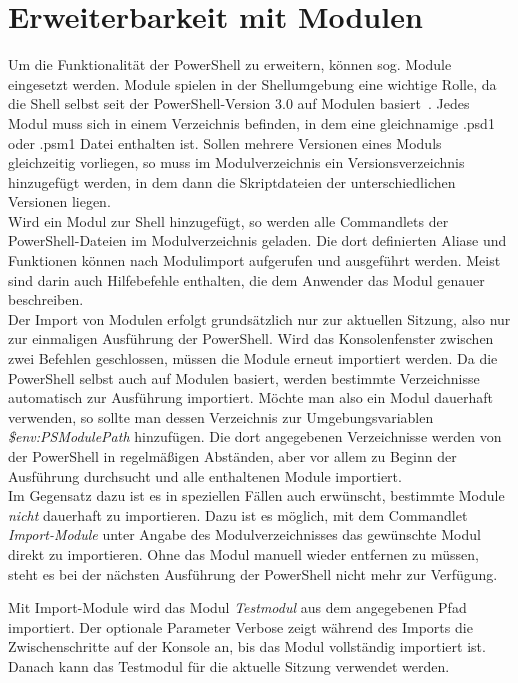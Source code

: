 \cite[S.~53 f.]{Monadjemi2017}
\section{Erweiterbarkeit mit Modulen}\label{PSModules}
Um die Funktionalität der PowerShell zu erweitern, können sog. Module eingesetzt werden. Module spielen in der Shellumgebung eine wichtige Rolle, da die Shell selbst seit der PowerShell-Version 3.0 auf Modulen basiert~\cite[S.~73]{Monadjemi2017}. Jedes Modul muss sich in einem Verzeichnis befinden, in dem eine gleichnamige .psd1 oder .psm1 Datei enthalten ist. Sollen mehrere Versionen eines Moduls gleichzeitig vorliegen, so muss im Modulverzeichnis ein Versionsverzeichnis hinzugefügt werden, in dem dann die Skriptdateien der unterschiedlichen Versionen liegen. \cite[S.~8 f.]{Monadjemi2017}\medskip\\
Wird ein Modul zur Shell hinzugefügt, so werden alle Commandlets der PowerShell-Dateien im Modulverzeichnis geladen. Die dort definierten Aliase und Funktionen können nach Modulimport aufgerufen und ausgeführt werden. Meist sind darin auch Hilfebefehle enthalten, die dem Anwender das Modul genauer beschreiben.\medskip\\
Der Import von Modulen erfolgt grundsätzlich nur zur aktuellen Sitzung, also nur zur einmaligen Ausführung der PowerShell. Wird das Konsolenfenster zwischen zwei Befehlen geschlossen, müssen die Module erneut importiert werden. Da die \mbox{PowerShell} selbst auch auf Modulen basiert, werden bestimmte Verzeichnisse automatisch zur Ausführung importiert. Möchte man also ein Modul dauerhaft verwenden, so sollte man dessen Verzeichnis zur Umgebungsvariablen \textit{\$env:PSModulePath} hinzufügen. Die dort angegebenen Verzeichnisse werden von der PowerShell in regelmäßigen Abständen, aber vor allem zu Beginn der Ausführung durchsucht und alle enthaltenen Module importiert.~\cite[S.~76]{Monadjemi2017}\medskip\\
Im Gegensatz dazu ist es in speziellen Fällen auch erwünscht, bestimmte Module \textit{nicht} dauerhaft zu importieren. Dazu ist es möglich, mit dem Commandlet \textit{Import-Module} unter Angabe des Modulverzeichnisses das gewünschte Modul direkt zu importieren. Ohne das Modul manuell wieder entfernen zu müssen, steht es bei der nächsten Ausführung der PowerShell nicht mehr zur Verfügung.~\cite[S.~45]{HolgerSchwichtenberg2018}
%

Mit Import-Module wird das Modul \textit{Testmodul} aus dem angegebenen Pfad importiert. Der optionale Parameter Verbose zeigt während des Imports die Zwischenschritte auf der Konsole an, bis das Modul vollständig importiert ist. Danach kann das Testmodul für die aktuelle Sitzung verwendet werden.
